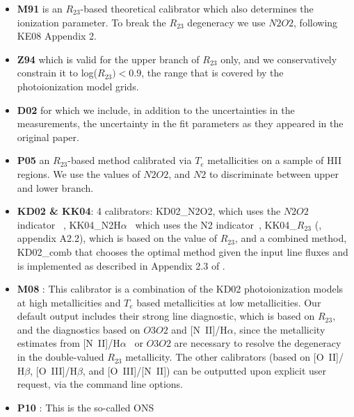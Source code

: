\documentclass{emulateapj}
\newcommand{\ha}{\ensuremath{\mathrm{H}\alpha}}
\newcommand{\hb}{\ensuremath{\mathrm{H}\beta}}
\begin{document}
\begin{itemize}
\item {\bf M91} \citep{mcgaugh91}
 is an $R_{23}$-based theoretical calibrator which
  also determines the ionization parameter. To break the $R_{23}$ degeneracy we use  $N2O2$, following KE08 Appendix 2. 
\item {\bf Z94} \citep{zaritsky94} which is valid for the upper branch
  of $R_{23}$ only, and we conservatively constrain it to
  log($R_{23})<0.9$, the range that is covered by the
  photoionization model grids.
\item {\bf D02} \citep{denicolo02} for which we include, in addition
  to the uncertainties in the measurements, the uncertainty in the fit
  parameters as they appeared in the original paper.
\item {\bf P05} \citep{pilyugin05} an $R_{23}$-based method calibrated via $T_e$ metallicities on a sample of HII regions. We use the values of $N2O2$, and $N2$ to discriminate between  upper and lower branch.
\item {\bf KD02 \& KK04}: 4 calibrators: KD02\_N2O2, which uses the
  $N2O2$ indicator~
\citep{kewley02}, KK04\_N2\ha~ which uses the N2
indicator~\citep{kobulnicky04}, KK04\_$R_{23}$ (\citealt{kewley08},
appendix A2.2), which is based on the value of $R_{23}$, and a
combined method, KD02\_comb that chooses the optimal method given the
input line fluxes and is implemented as described in Appendix 2.3 of
\citet{kewley08}.
\item {\bf M08} \citep{maiolino08}: This calibrator is a combination
  of the KD02 photoionization models at high metallicities and $T_e$
  based metallicities at low metallicities. Our default output
  includes their strong line diagnostic, which is based on $R_{23}$, and
  the diagnostics based on $O3O2$ and [N~II]/\ha, since the
  metallicity estimates from [N~II]/\ha~ or $O3O2$ are necessary to
  resolve the degeneracy in the double-valued $R_{23}$
  metallicity. The other calibrators (based on [O~II]/\hb,
  [O~III]/\hb, and [O~III]/[N~II]) can be outputted upon explicit user
  request, via the command line options.
\item {\bf P10} \citep{pilyugin10}: This is the so-called ONS

\end{itemize}
\end{document}
